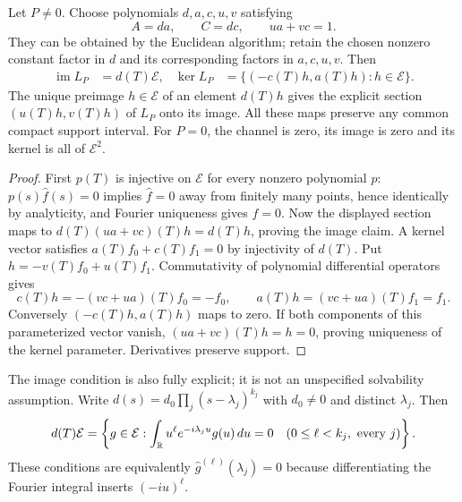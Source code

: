 \begin{proposition}
Let $P\ne0$. Choose polynomials $d,a,c,u,v$ satisfying
\[
 A=da,\qquad C=dc,\qquad ua+vc=1.
\]
They can be obtained by the Euclidean algorithm; retain the chosen
nonzero constant factor in $d$ and its corresponding factors in
$a,c,u,v$. Then
\begin{align}
 \operatorname{im}L_P&=d(T)\mathcal E,
 &\ker L_P&=\{(-c(T)h,a(T)h):h\in\mathcal E\}.
 \label{eq:retained-channel-kernel}
\end{align}
The unique preimage $h\in\mathcal E$ of an element $d(T)h$ gives
the explicit section $(u(T)h,v(T)h)$ of $L_P$ onto its image.
All these maps preserve any common compact support interval.
For $P=0$, the channel is zero, its image is zero and its kernel is
all of $\mathcal E^2$.
\end{proposition}
\begin{proof}
First $p(T)$ is injective on $\mathcal E$ for every nonzero polynomial
$p$: $p(s)\widehat f(s)=0$ implies $\widehat f=0$ away from finitely
many points, hence identically by analyticity, and Fourier uniqueness
gives $f=0$. Now the displayed section maps to
$d(T)(ua+vc)(T)h=d(T)h$, proving the image claim. A kernel vector
satisfies $a(T)f_0+c(T)f_1=0$ by injectivity of $d(T)$. Put
$h=-v(T)f_0+u(T)f_1$. Commutativity of polynomial differential operators
gives
\[
 c(T)h=-(vc+ua)(T)f_0=-f_0,\qquad
 a(T)h=(vc+ua)(T)f_1=f_1.
\]
Conversely $(-c(T)h,a(T)h)$ maps to zero. If both components of
this parameterized vector vanish, $(ua+vc)(T)h=h=0$, proving
uniqueness of the kernel parameter. Derivatives preserve support.
\end{proof}

The image condition is also fully explicit; it is not an unspecified
solvability assumption. Write
$d(s)=d_0\prod_j(s-\lambda_j)^{k_j}$ with $d_0\ne0$ and distinct
$\lambda_j$. Then
\begin{equation}
 d(T)\mathcal E
 =\left\{g\in\mathcal E:
 \int_\mathbb R u^\ell e^{-i\lambda_j u}g(u)\,du=0
 \quad(0\le\ell<k_j,\ \hbox{every }j)\right\}.
 \label{eq:retained-channel-moments}
\end{equation}
These conditions are equivalently
$\widehat g^{(\ell)}(\lambda_j)=0$ because differentiating the
Fourier integral inserts $(-iu)^\ell$.

